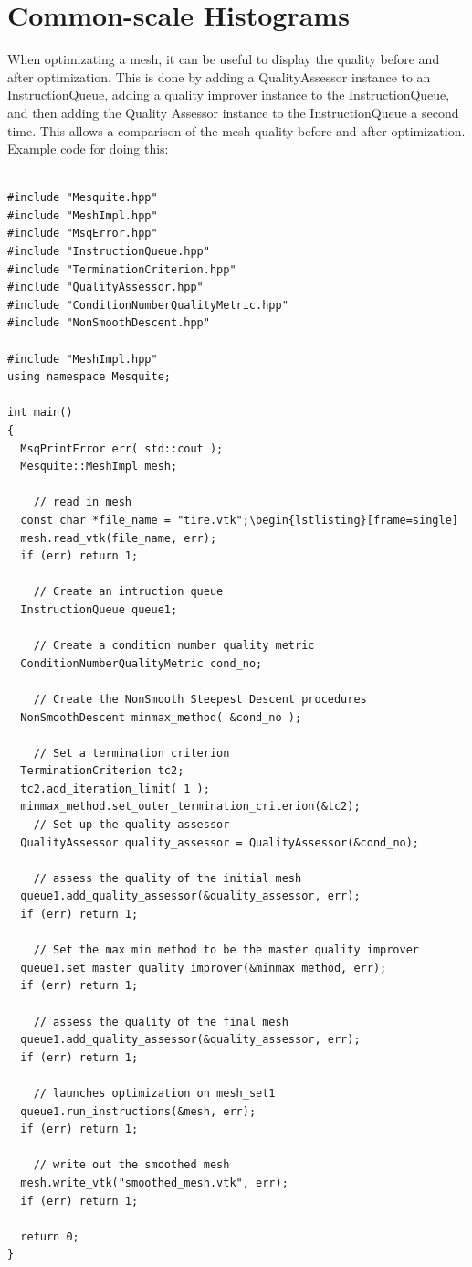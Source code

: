 \section{Common-scale Histograms}

When optimizating a mesh, it can be useful to display the quality before and after optimization.  This is done by adding a QualityAssessor instance to an InstructionQueue, adding a quality improver instance to the InstructionQueue, and then adding the Quality Assessor instance to the InstructionQueue a second time.  This allows a comparison of the mesh quality before and after optimization.  Example code for doing this:

\begin{lstlisting}[frame=single]

#include "Mesquite.hpp"
#include "MeshImpl.hpp"
#include "MsqError.hpp"
#include "InstructionQueue.hpp"
#include "TerminationCriterion.hpp"
#include "QualityAssessor.hpp"
#include "ConditionNumberQualityMetric.hpp"
#include "NonSmoothDescent.hpp"

#include "MeshImpl.hpp"
using namespace Mesquite;

int main()
{
  MsqPrintError err( std::cout );
  Mesquite::MeshImpl mesh;

    // read in mesh
  const char *file_name = "tire.vtk";\begin{lstlisting}[frame=single]
  mesh.read_vtk(file_name, err);
  if (err) return 1;

    // Create an intruction queue
  InstructionQueue queue1;

    // Create a condition number quality metric
  ConditionNumberQualityMetric cond_no;

    // Create the NonSmooth Steepest Descent procedures
  NonSmoothDescent minmax_method( &cond_no );

    // Set a termination criterion
  TerminationCriterion tc2;
  tc2.add_iteration_limit( 1 );
  minmax_method.set_outer_termination_criterion(&tc2);
    // Set up the quality assessor
  QualityAssessor quality_assessor = QualityAssessor(&cond_no);

    // assess the quality of the initial mesh
  queue1.add_quality_assessor(&quality_assessor, err);
  if (err) return 1;

    // Set the max min method to be the master quality improver
  queue1.set_master_quality_improver(&minmax_method, err);
  if (err) return 1;

    // assess the quality of the final mesh
  queue1.add_quality_assessor(&quality_assessor, err);
  if (err) return 1;

    // launches optimization on mesh_set1
  queue1.run_instructions(&mesh, err);
  if (err) return 1;

    // write out the smoothed mesh
  mesh.write_vtk("smoothed_mesh.vtk", err);
  if (err) return 1;

  return 0;
}

\end{lstlisting}


